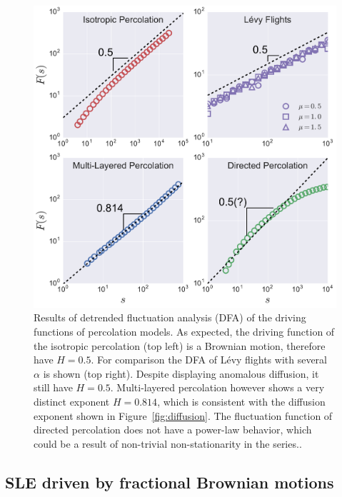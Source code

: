 \begin{figure}
\begin{center}
    \includegraphics[scale=0.45]{chapters/ch6-asle/figs/dfaresults}
\end{center}
\caption{Results of detrended fluctuation analysis (DFA) of the driving
    functions of percolation models. As expected, the driving function of the
    isotropic percolation (top left) is a Brownian motion, therefore have
    $H=0.5$. For comparison the DFA of L\'evy flights with several $\alpha$ is
    shown (top right). Despite displaying anomalous diffusion, it still have
    $H=0.5$. Multi-layered percolation however shows a very distinct exponent
    $H=0.814$, which is consistent with the diffusion exponent shown in
    Figure~\ref{fig:diffusion}. The fluctuation function of directed
    percolation does not have a power-law behavior, which could be a result of
    non-trivial non-stationarity in the series..}
\label{fig:dfaresults}
\end{figure}
\clearpage

\subsection{SLE driven by fractional Brownian motions}
\label{sec:slebh}

